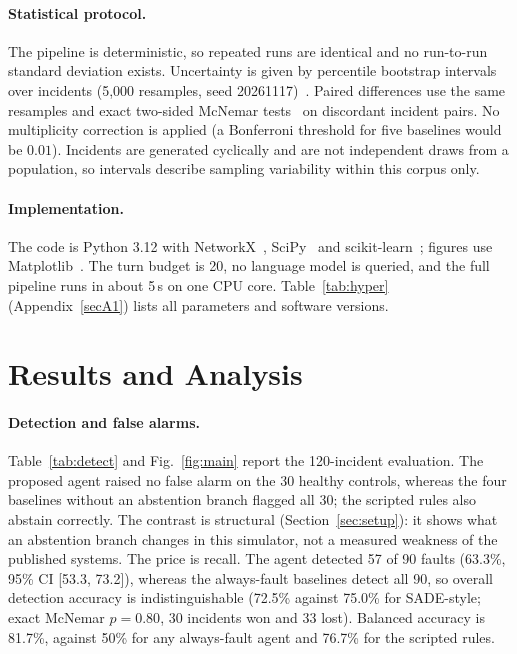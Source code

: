 \documentclass[pdflatex,sn-basic,Numbered,iicol]{sn-jnl}
\begin{document}
\paragraph{Statistical protocol.} The pipeline is deterministic, so repeated runs are identical and no run-to-run standard deviation exists. Uncertainty is given by percentile bootstrap intervals over incidents (5,000 resamples, seed 20261117)~\cite{efron1993}. Paired differences use the same resamples and exact two-sided McNemar tests~\cite{mcnemar1947} on discordant incident pairs. No multiplicity correction is applied (a Bonferroni threshold for five baselines would be $0.01$). Incidents are generated cyclically and are not independent draws from a population, so intervals describe sampling variability within this corpus only.

\paragraph{Implementation.} The code is Python 3.12 with NetworkX~\cite{hagberg2008networkx}, SciPy~\cite{virtanen2020scipy} and scikit-learn~\cite{pedregosa2011sklearn}; figures use Matplotlib~\cite{hunter2007matplotlib}. The turn budget is 20, no language model is queried, and the full pipeline runs in about 5\,s on one CPU core. Table~\ref{tab:hyper} (Appendix~\ref{secA1}) lists all parameters and software versions.

\section{Results and Analysis}\label{sec:results}

\paragraph{Detection and false alarms.} Table~\ref{tab:detect} and Fig.~\ref{fig:main} report the 120-incident evaluation. The proposed agent raised no false alarm on the 30 healthy controls, whereas the four baselines without an abstention branch flagged all 30; the scripted rules also abstain correctly. The contrast is structural (Section~\ref{sec:setup}): it shows what an abstention branch changes in this simulator, not a measured weakness of the published systems. The price is recall. The agent detected 57 of 90 faults (63.3\%, 95\% CI [53.3, 73.2]), whereas the always-fault baselines detect all 90, so overall detection accuracy is indistinguishable (72.5\% against 75.0\% for SADE-style; exact McNemar $p=0.80$, 30 incidents won and 33 lost). Balanced accuracy is 81.7\%, against 50\% for any always-fault agent and 76.7\% for the scripted rules.
\end{document}
